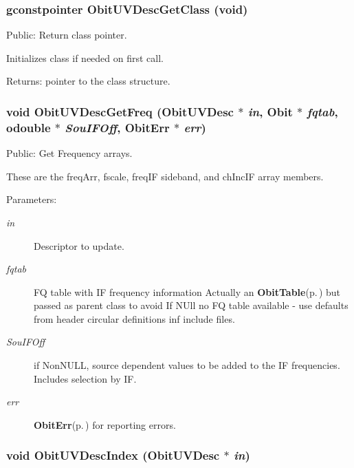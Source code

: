 \subsubsection{\setlength{\rightskip}{0pt plus 5cm}gconstpointer Obit\-UVDesc\-Get\-Class (void)}\label{ObitUVDesc_8h_a10}


Public: Return class pointer. 

Initializes class if needed on first call. \begin{Desc}
\item[Returns:]pointer to the class structure. \end{Desc}
\subsubsection{\setlength{\rightskip}{0pt plus 5cm}void Obit\-UVDesc\-Get\-Freq ({\bf Obit\-UVDesc} $\ast$ {\em in}, {\bf Obit} $\ast$ {\em fqtab}, {\bf odouble} $\ast$ {\em Sou\-IFOff}, {\bf Obit\-Err} $\ast$ {\em err})}\label{ObitUVDesc_8h_a15}


Public: Get Frequency arrays. 

These are the freq\-Arr, fscale, freq\-IF sideband, and ch\-Inc\-IF array members. \begin{Desc}
\item[Parameters:]
\begin{description}
\item[{\em in}]Descriptor to update. \item[{\em fqtab}]FQ table with IF frequency information Actually an {\bf Obit\-Table}{\rm (p.\,\pageref{structObitTable})} but passed as parent class to avoid If NUll no FQ table available - use defaults from header circular definitions inf include files. \item[{\em Sou\-IFOff}]if Non\-NULL, source dependent values to be added to the IF frequencies. Includes selection by IF. \item[{\em err}]{\bf Obit\-Err}{\rm (p.\,\pageref{structObitErr})} for reporting errors. \end{description}
\end{Desc}
\subsubsection{\setlength{\rightskip}{0pt plus 5cm}void Obit\-UVDesc\-Index ({\bf Obit\-UVDesc} $\ast$ {\em in})}\label{ObitUVDesc_8h_a13}



